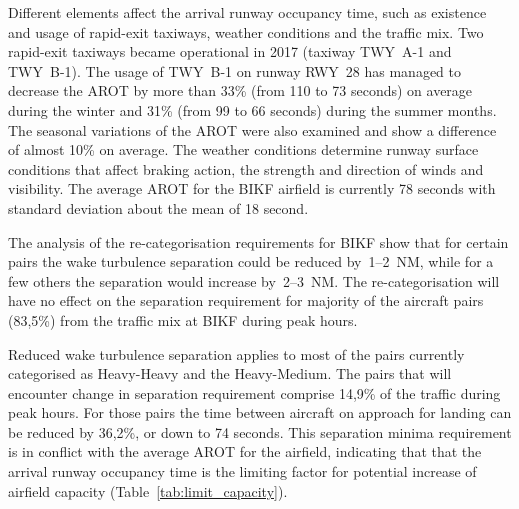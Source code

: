 Different elements affect the arrival runway occupancy time, such as existence and usage of rapid-exit taxiways, weather conditions and the traffic mix. Two rapid-exit taxiways became operational in 2017 (taxiway TWY~A-1 and TWY~B-1). The usage of TWY~B-1 on runway RWY~28 has managed to decrease the AROT by more than 33\% (from 110 to 73 seconds) on average during the winter and 31\% (from 99 to 66 seconds) during the summer months. The seasonal variations of the AROT were also examined and show a difference of almost 10\% on average. The weather conditions determine runway surface conditions that affect braking action, the strength and direction of winds and visibility. The average AROT for the BIKF airfield is currently 78 seconds with standard
deviation about the mean of 18 second.


The analysis of the re-categorisation requirements for BIKF show that for certain pairs the wake turbulence separation could be reduced by~1--2~NM, while for a few others the separation would increase by~2--3~NM. The re-categorisation will have no effect on the separation requirement for majority of the aircraft pairs (83,5\%) from the traffic mix at BIKF during peak hours. 

Reduced wake turbulence separation applies to most of the pairs currently categorised as Heavy-Heavy and the Heavy-Medium. 
The pairs that will encounter change in separation requirement comprise 14,9\% of the traffic during peak hours. For those pairs the time between aircraft on approach for landing can be reduced by 36,2\%, or down to 74 seconds. This separation minima requirement is in conflict with the average AROT for the airfield, indicating that that the arrival runway occupancy time is the limiting factor for potential increase of airfield capacity (Table~\ref{tab:limit_capacity}).

